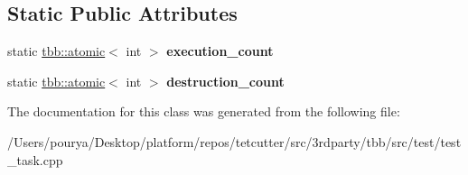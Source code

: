 \subsection*{Static Public Attributes}
\begin{DoxyCompactItemize}
\item 
\hypertarget{classDagTask_a31b0ab99e6089b00e5cd27819bba9b68}{}static \hyperlink{structtbb_1_1atomic}{tbb\+::atomic}$<$ int $>$ {\bfseries execution\+\_\+count}\label{classDagTask_a31b0ab99e6089b00e5cd27819bba9b68}

\item 
\hypertarget{classDagTask_ae46b80596149d67071d428bee1ee4f48}{}static \hyperlink{structtbb_1_1atomic}{tbb\+::atomic}$<$ int $>$ {\bfseries destruction\+\_\+count}\label{classDagTask_ae46b80596149d67071d428bee1ee4f48}

\end{DoxyCompactItemize}


The documentation for this class was generated from the following file\+:\begin{DoxyCompactItemize}
\item 
/\+Users/pourya/\+Desktop/platform/repos/tetcutter/src/3rdparty/tbb/src/test/test\+\_\+task.\+cpp\end{DoxyCompactItemize}
